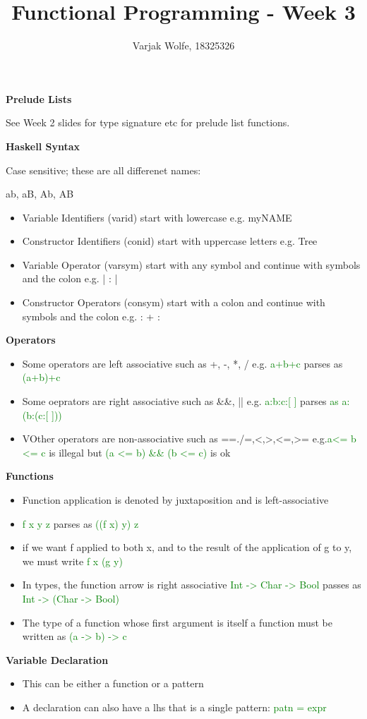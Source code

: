 \documentclass{article}
\title{Functional Programming - Week 3}
\author{Varjak Wolfe, 18325326}
\begin{document}
\textbf{Prelude Lists}

See Week 2 slides for type signature etc for prelude list functions.


\textbf{Haskell Syntax}

Case sensitive; these are all differenet names:

ab, aB, Ab, AB

\begin{itemize}
\item Variable Identifiers (varid) start with lowercase e.g. myNAME
\item Constructor Identifiers (conid) start with uppercase letters e.g. Tree
\item Variable Operator (varsym) start with any symbol and continue with symbols and the colon e.g. | : |
\item Constructor Operators (consym) start with a colon and continue with symbols and the colon e.g. : + :
\end{itemize}


\textbf{Operators}

\begin{itemize}
\item Some operators are left associative such as +, -, *, / e.g. \textcolor{green}{a+b+c} parses as \textcolor{green}{(a+b)+c}
\item Some oeprators are right associative such as \&\&, || e.g. \textcolor{green}{a:b:c:[ ]} parses \textcolor{green}{as a:(b:(c:[ ]))}
\item VOther operators are non-associative such as ==./=,<,>,<=,>= e.g.\textcolor{green}{a<= b <= c} is illegal but \textcolor{green}{(a <= b) \&\& (b <= c)} is ok
\end{itemize}


\textbf{Functions}

\begin{itemize}
\item Function application is denoted by juxtaposition and is left-associative
\item \textcolor{green}{f  x  y  z} parses as \textcolor{green}{((f  x)  y)  z}
\item if we want f applied to both x, and to the result of the application of g to y, we must write \textcolor{green}{f  x  (g  y)}
\item In types, the function arrow is right associative \textcolor{green}{Int -> Char -> Bool} passes as \textcolor{green}{Int -> (Char -> Bool)}
\item The type of a function whose first argument is itself a function must be written as \textcolor{green}{(a -> b) -> c}
\end{itemize}


\textbf{Variable Declaration}

\begin{itemize}
\item This can be either a function or a pattern
\item A declaration can also have a lhs that is a single pattern: \textcolor{green}{patn = expr}
\end{itemize}
\end{document}
